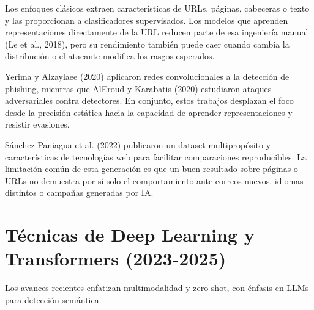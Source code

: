 \documentclass[11pt,a4paper,oneside]{report}
\begin{document}
Los enfoques clásicos extraen características de URLs, páginas, cabeceras o texto y las proporcionan a clasificadores supervisados. Los modelos que aprenden representaciones directamente de la URL reducen parte de esa ingeniería manual (Le et al., 2018), pero su rendimiento también puede caer cuando cambia la distribución o el atacante modifica los rasgos esperados.

Yerima y Alzaylaee (2020) aplicaron redes convolucionales a la detección de phishing, mientras que AlEroud y Karabatis (2020) estudiaron ataques adversariales contra detectores. En conjunto, estos trabajos desplazan el foco desde la precisión estática hacia la capacidad de aprender representaciones y resistir evasiones.

Sánchez-Paniagua et al. (2022) publicaron un dataset multipropósito y características de tecnologías web para facilitar comparaciones reproducibles. La limitación común de esta generación es que un buen resultado sobre páginas o URLs no demuestra por sí solo el comportamiento ante correos nuevos, idiomas distintos o campañas generadas por IA.

\section{Técnicas de Deep Learning y Transformers (2023-2025)}

Los avances recientes enfatizan multimodalidad y zero-shot, con énfasis en LLMs para detección semántica.
\end{document}
